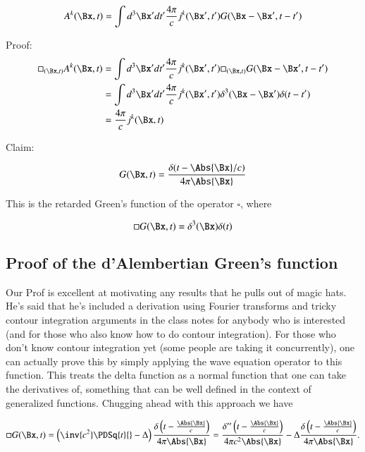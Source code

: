 \begin{equation}\label{eqn:relativisticElectrodynamicsL18:50}
A^k(\Bx, t)
= \int d^3 \Bx' dt' \frac{4 \pi}{c} j^k(\Bx', t') G(\Bx - \Bx', t - t')
\end{equation}

Proof:
\begin{align*}
\square_{(\Bx, t)} A^k(\Bx, t)
&=
\int d^3 \Bx' dt' \frac{4 \pi}{c} j^k(\Bx', t')
\square_{(\Bx, t)}
G(\Bx - \Bx', t - t') \\
&=
\int d^3 \Bx' dt' \frac{4 \pi}{c} j^k(\Bx', t')
\delta^3( \Bx - \Bx') \delta( t - t') \\
&=
\frac{4 \pi}{c} j^k(\Bx, t)
\end{align*}

Claim:

\begin{equation}\label{eqn:relativisticElectrodynamicsL18:70}
G(\Bx, t) = \frac{\delta(t - \Abs{\Bx}/c)}{4 \pi \Abs{\Bx} }
\end{equation}

This is the retarded Green's function of the operator $\square$, where

\begin{equation}\label{eqn:relativisticElectrodynamicsL18:90}
\square G(\Bx, t) = \delta^3(\Bx) \delta(t)
\end{equation}

\subsection{Proof of the d'Alembertian Green's function}

Our Prof is excellent at motivating any results that he pulls out of magic hats.  He's said that he's included a derivation using Fourier transforms and tricky contour integration arguments in the class notes for anybody who is interested (and for those who also know how to do contour integration).  For those who don't know contour integration yet (some people are taking it concurrently), one can actually prove this by simply applying the wave equation operator to this function.  This treats the delta function as a normal function that one can take the derivatives of, something that can be well defined in the context of generalized functions.  Chugging ahead with this approach we have

\begin{equation}\label{eqn:relativisticElectrodynamicsL18:110}
\square G(\Bx, t)
=
\left(\inv{c^2} \PDSq{t}{} - \Delta\right)
\frac{\delta\left(t - \frac{\Abs{\Bx}}{c}\right)}{4 \pi \Abs{\Bx} }
=
\frac{\delta''\left(t - \frac{\Abs{\Bx}}{c}\right)}{4 \pi c^2 \Abs{\Bx} }
- \Delta \frac{\delta\left(t - \frac{\Abs{\Bx}}{c}\right)}{4 \pi \Abs{\Bx} }.
\end{equation}

